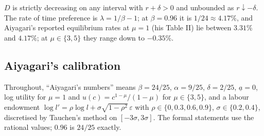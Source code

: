 $D$ is strictly decreasing on any interval with $r+\delta>0$ and unbounded as $r\downarrow-\delta$.
The rate of time preference is $\lambda=1/\beta-1$; at $\beta=0.96$ it is $1/24\approx4.17\%$, and
Aiyagari's reported equilibrium rates at $\mu=1$ (his Table II) lie between $3.31\%$ and $4.17\%$; at $\mu\in\{3,5\}$ they range down to $-0.35\%$.

\subsection{Aiyagari's calibration}

Throughout, ``Aiyagari's numbers'' means $\beta=24/25$, $\alpha=9/25$, $\delta=2/25$,
$\underline a=0$, log utility for $\mu=1$ and $u(c)=c^{1-\mu}/(1-\mu)$ for $\mu\in\{3,5\}$, and a
labour endowment $\log l'=\rho\log l+\sigma\sqrt{1-\rho^2}\,\varepsilon$ with
$\rho\in\{0,0.3,0.6,0.9\}$, $\sigma\in\{0.2,0.4\}$, discretised by Tauchen's method on
$[-3\sigma,3\sigma]$. The formal statements use the rational values; $0.96$ is $24/25$ exactly.
